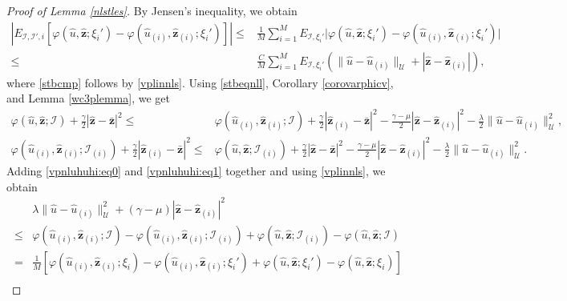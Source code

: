 \documentclass[10pt,reqno]{amsart}
\newcommand{\1}{{\chi}}
\def\leq{\leqslant}
\numberwithin{equation}{section}
\theoremstyle{thmlemcorr}
\numberwithin{theorem}{section}
\theoremstyle{thmlemcorr*}
\theoremstyle{defi}
\theoremstyle{remexample}
\theoremstyle{ass}
\begin{document}
\begin{proof}[Proof of Lemma \ref{nlstles}]
	By Jensen's inequality, we obtain 
	\begin{align}
		\label{stbcmp}
		|E_{\mathcal{I}, \mathcal{I}', i}[\varphi(\hat{u}, \hat{\boldsymbol{z}};\xi_i') - \varphi(\hat{u}_{(i)}, \hat{\boldsymbol{z}}_{(i)}; \xi_i')]|
		\leq & \frac{1}{M}\sum_{i=1}^ME_{\mathcal{I}, \xi_i'}\bigg|\varphi(\hat{u}, \hat{\boldsymbol{z}};\xi_i')-\varphi(\hat{u}_{(i)}, \hat{\boldsymbol{z}}_{(i)}; \xi_i')\bigg|\nonumber\\
		\leq&  \frac{C}{M}\sum_{i=1}^ME_{\mathcal{I}, \xi_i'}(\|\hat{u}-\hat{u}_{(i)}\|_{\mathcal{U}} + |\hat{\boldsymbol{z}}-\hat{\boldsymbol{z}}_{(i)}| ),
	\end{align}
	where \eqref{stbcmp} follows by \eqref{vplinnls}. Using \eqref{stbeqnll}, Corollary \ref{corovarphicv}, and Lemma \ref{wc3plemma}, we get
	\begin{align}
		\varphi(\hat{u}, \hat{\boldsymbol{z}}; {\mathcal{I}}) + \frac{\gamma}{2}|\hat{\boldsymbol{z}}-\bar{\boldsymbol{z}}|^2
		\leq& \varphi(\hat{u}_{(i)}, \hat{\boldsymbol{z}}_{(i)}; {\mathcal{I}}) + \frac{\gamma}{2}|\hat{\boldsymbol{z}}_{(i)}-\bar{\boldsymbol{z}}|^2 - \frac{\gamma-\mu}{2}|\hat{\boldsymbol{z}}-\hat{\boldsymbol{z}}_{(i)}|^2-\frac{\lambda}{2}\|\hat{u}-\hat{u}_{(i)}\|_{\mathcal{U}}^2, \label{vpnluhuhi:eq0}\\
		\varphi(\hat{u}_{(i)}, \hat{\boldsymbol{z}}_{(i)}; {\mathcal{I}}_{(i)}) + \frac{\gamma}{2}|\hat{\boldsymbol{z}}_{(i)}-\bar{\boldsymbol{z}}|^2
		\leq& \varphi(\hat{u}, \hat{\boldsymbol{z}}; {\mathcal{I}}_{(i)}) + \frac{\gamma}{2}|\hat{\boldsymbol{z}}-\bar{\boldsymbol{z}}|^2-\frac{\gamma-\mu}{2}|\hat{\boldsymbol{z}}-\hat{\boldsymbol{z}}_{(i)}|^2-\frac{\lambda}{2}\|\hat{u}-\hat{u}_{(i)}\|_{\mathcal{U}}^2. \label{vpnluhuhi:eq1}
	\end{align}
	Adding \eqref{vpnluhuhi:eq0} and \eqref{vpnluhuhi:eq1} together and using \eqref{vplinnls}, we obtain 
	\begin{align}
		&\lambda\|\hat{u}-\hat{u}_{(i)}\|^2_{\mathcal{U}}+(\gamma-\mu)|\hat{\boldsymbol{z}}-\hat{\boldsymbol{z}}_{(i)}|^2\nonumber\\
		\leq& \varphi(\hat{u}_{(i)}, \hat{\boldsymbol{z}}_{(i)}; {\mathcal{I}}) - \varphi(\hat{u}_{(i)}, \hat{\boldsymbol{z}}_{(i)}; {\mathcal{I}}_{(i)}) + \varphi(\hat{u}, \hat{\boldsymbol{z}}; {\mathcal{I}}_{(i)}) - \varphi(\hat{u}, \hat{\boldsymbol{z}}; {\mathcal{I}})\nonumber\\
		= & \frac{1}{M}[\varphi(\hat{u}_{(i)}, \hat{\boldsymbol{z}}_{(i)}; \xi_i) - \varphi(\hat{u}_{(i)}, \hat{\boldsymbol{z}}_{(i)}; \xi_i') + \varphi(\hat{u}, \hat{\boldsymbol{z}}; \xi_i') - \varphi(\hat{u}, \hat{\boldsymbol{z}}; \xi_i)]\nonumber\\

\end{align}
\end{proof}
\end{document}
